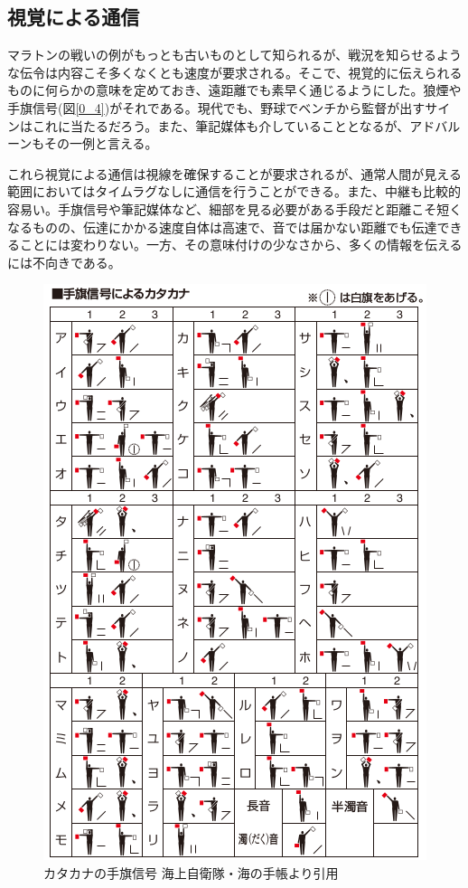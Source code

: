 \subsection{視覚による通信}

マラトンの戦いの例がもっとも古いものとして知られるが、戦況を知らせるような伝令は内容こそ多くなくとも速度が要求される。そこで、視覚的に伝えられるものに何らかの意味を定めておき、遠距離でも素早く通じるようにした。狼煙や手旗信号(図\ref{0_4})がそれである。現代でも、野球でベンチから監督が出すサインはこれに当たるだろう。また、筆記媒体も介していることとなるが、アドバルーンもその一例と言える。

これら視覚による通信は視線を確保することが要求されるが、通常人間が見える範囲においてはタイムラグなしに通信を行うことができる。また、中継も比較的容易い。手旗信号や筆記媒体など、細部を見る必要がある手段だと距離こそ短くなるものの、伝達にかかる速度自体は高速で、音では届かない距離でも伝達できることには変わりない。一方、その意味付けの少なさから、多くの情報を伝えるには不向きである。

\begin{figure}[p]
\centering
\includegraphics[width=\linewidth,keepaspectratio,bb=0 0 424 637]{fig/fig0_4.png}
\caption{カタカナの手旗信号 海上自衛隊・海の手帳より引用}\label{fig0_4}
\end{figure}


